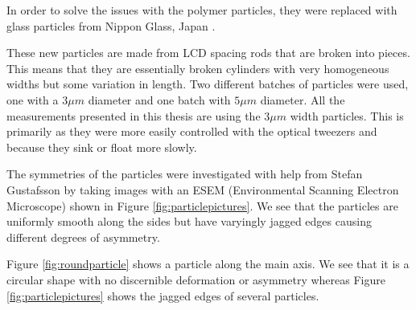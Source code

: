 In order to solve the issues with the polymer particles, they were replaced with glass particles from Nippon Glass, Japan \cite{Particles}. 

These new particles are made from LCD spacing rods that are broken into pieces. This means that they are essentially broken cylinders with very homogeneous widths but some variation in length. Two different batches of particles were used, one with a $3\mu m$ diameter and one batch with $5 \mu m$ diameter. All the measurements presented in this thesis are using the $3 \mu m$ width particles. This is primarily as they were more easily controlled with the optical tweezers and because they sink or float more slowly. 

The symmetries of the particles were investigated with help from Stefan Gustafsson by taking images with an 
ESEM (Environmental Scanning Electron Microscope) shown in Figure \ref{fig:particlepictures}. We see that the 
particles are uniformly smooth along the sides but have varyingly jagged edges causing different degrees of asymmetry. 

Figure \ref{fig:roundparticle} shows a particle along the main axis. We see that it is a circular shape
with no discernible deformation or asymmetry whereas Figure \ref{fig:particlepictures} shows the jagged edges of several particles. 


